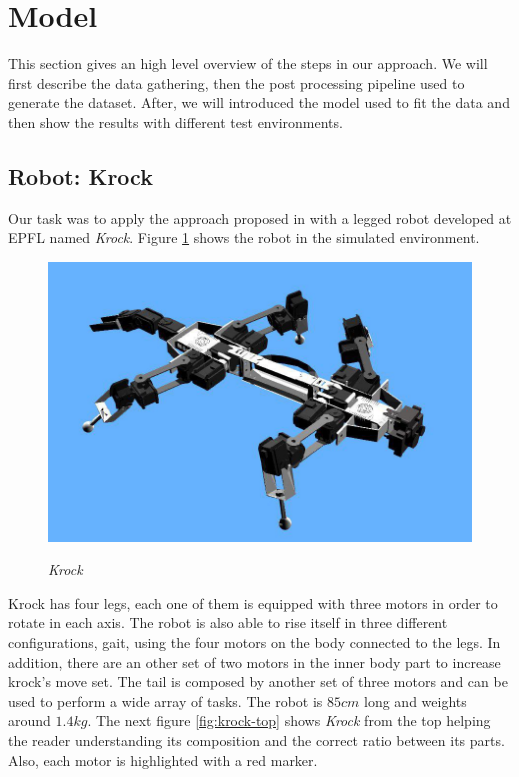 \documentclass[../document.tex]{subfiles}
\begin{document}
\section{Model}
This section gives an high level overview of the steps in our approach. We will first describe the data gathering,  then the post processing pipeline used to generate the dataset. After, we will introduced the model used to fit the data and then show the results with different test environments.
\subsection{Robot: Krock}
Our task was to apply the approach proposed in \cite{omar@traversability} with a legged robot developed at EPFL named 
\emph{Krock}. Figure \ref{fig:krock} shows the robot in the simulated environment.
\begin{figure}[H]
    \centering
    \includegraphics[width=0.5\linewidth]{img/krock-1.jpg}
    \label{fig:krock}
    \caption{\emph{Krock}}
\end{figure}
Krock has four legs, each one of them is equipped with three motors in order to rotate in each axis. The robot is 
also able to rise itself in three different configurations, gait, using the four motors on the body connected 
to the legs. In addition, there are an other set of two motors in the inner body part to increase krock's move set. 
The tail is composed by another set of three motors and can be used to perform a wide array of tasks.
The robot is $85cm$ long and weights around $1.4kg$. The next figure \ref{fig:krock-top} shows \emph{Krock} from the top helping the reader understanding its composition and the correct ratio between its parts. Also, each motor is highlighted with a red marker.
\end{document}
